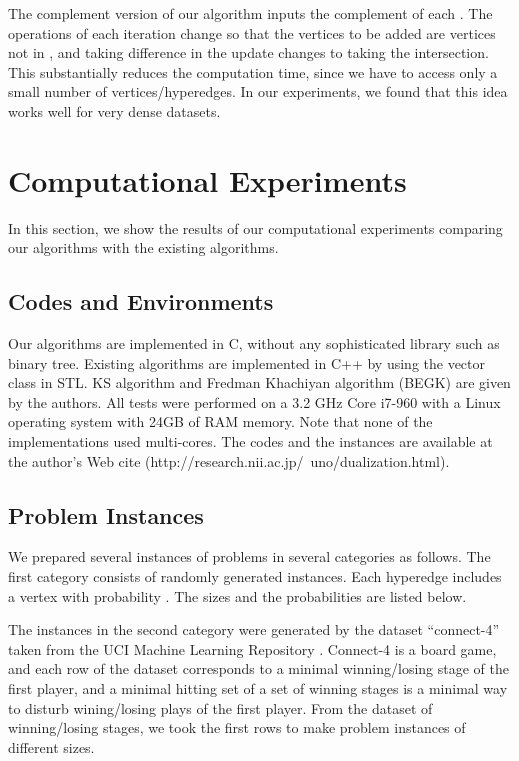 The complement version of our algorithm inputs the complement of each
 .
The operations of each iteration change so that the vertices to be added
 are vertices not in , and taking difference in the  update
 changes to taking the intersection.
This substantially reduces the computation time, since we have to access
 only a small number of vertices/hyperedges.
In our experiments, we found that this idea works well for very dense datasets.

\section{Computational Experiments}

In this section, we show the results of our computational experiments
 comparing our algorithms with the existing algorithms.

\subsection{Codes and Environments}

Our algorithms are implemented in C, without any sophisticated library such
 as binary tree.
Existing algorithms are implemented in C++ by using the vector class in STL.
KS algorithm and Fredman Khachiyan algorithm
 (BEGK\cite{BeEk03,BeEk06}) are given by the authors.
All tests were performed on a 3.2 GHz Core i7-960 with a Linux operating system
 with 24GB of RAM memory.
Note that none of the implementations used multi-cores.
The codes and the instances are available at the author's Web cite
 (http://research.nii.ac.jp/~uno/dualization.html).

\subsection{Problem Instances}

We prepared several instances of problems in several categories as follows.
 The first category consists of randomly generated instances.
Each hyperedge includes a vertex  with probability .
The sizes and the probabilities are listed below.


The instances in the second category were generated by the dataset
 ``connect-4'' taken from the UCI Machine Learning Repository \cite{UCI}.
Connect-4 is a board game, and each row of the dataset corresponds to
 a minimal winning/losing stage of the first player, and a minimal hitting
 set of a set of winning stages is a minimal way to disturb wining/losing
 plays of the first player.
From the dataset of winning/losing stages,
 we took the first  rows to make problem instances of different sizes.

